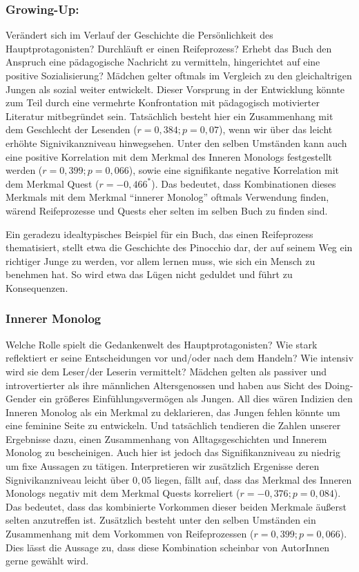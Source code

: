 \subsubsection{Growing-Up:}

Verändert sich im Verlauf der Geschichte die Persönlichkeit des
Hauptprotagonisten? Durchläuft er einen Reifeprozess? Erhebt das Buch
den Anspruch eine pädagogische Nachricht zu vermitteln, hingerichtet auf
eine positive Sozialisierung? Mädchen gelter oftmals im Vergleich zu den
gleichaltrigen Jungen als sozial weiter entwickelt. Dieser Vorsprung in
der Entwicklung könnte zum Teil durch eine vermehrte Konfrontation mit
pädagogisch motivierter Literatur mitbegründet sein. Tatsächlich besteht
hier ein Zusammenhang mit dem Geschlecht der Lesenden
($r= 0{,}384; p= 0{,}07$), wenn wir über das leicht erhöhte
Signivikanzniveau hinwegsehen. Unter den selben Umständen kann auch eine
positive Korrelation mit dem Merkmal des Inneren Monologs festgestellt
werden ($r= 0{,}399; p= 0{,}066$), sowie eine signifikante negative
Korrelation mit dem Merkmal Quest ($r= -0{,}466^*$). Das bedeutet, dass
Kombinationen dieses Merkmals mit dem Merkmal ``innerer Monolog''
oftmals Verwendung finden, wärend Reifeprozesse und Quests eher selten
im selben Buch zu finden sind.

Ein geradezu idealtypisches Beispiel für ein Buch, das einen
Reifeprozess thematisiert, stellt etwa die Geschichte des Pinocchio dar,
der auf seinem Weg ein richtiger Junge zu werden, vor allem lernen muss,
wie sich ein Mensch zu benehmen hat. So wird etwa das Lügen nicht
geduldet und führt zu Konsequenzen.

\subsubsection{Innerer Monolog}

Welche Rolle spielt die Gedankenwelt des Hauptprotagonisten? Wie stark
reflektiert er seine Entscheidungen vor und/oder nach dem Handeln? Wie
intensiv wird sie dem Leser/der Leserin vermittelt? Mädchen gelten als
passiver und introvertierter als ihre männlichen Altersgenossen und
haben aus Sicht des Doing-Gender ein größeres Einfühlungsvermögen als
Jungen. All dies wären Indizien den Inneren Monolog als ein Merkmal zu
deklarieren, das Jungen fehlen könnte um eine feminine Seite zu
entwickeln. Und tatsächlich tendieren die Zahlen unserer Ergebnisse
dazu, einen Zusammenhang von Alltagsgeschichten und Innerem Monolog zu
bescheinigen. Auch hier ist jedoch das Signifikanzniveau zu niedrig um
fixe Aussagen zu tätigen. Interpretieren wir zusätzlich Ergenisse deren
Signivikanzniveau leicht über $0{,}05$ liegen, fällt auf, dass das
Merkmal des Inneren Monologs negativ mit dem Merkmal Quests korreliert
($r= -0{,}376; p= 0{,}084$). Das bedeutet, dass das kombinierte
Vorkommen dieser beiden Merkmale äußerst selten anzutreffen ist.
Zusätzlich besteht unter den selben Umständen ein Zusammenhang mit dem
Vorkommen von Reifeprozessen ($r= 0{,}399; p= 0{,}066$). Dies lässt die
Aussage zu, dass diese Kombination scheinbar von AutorInnen gerne
gewählt wird.

